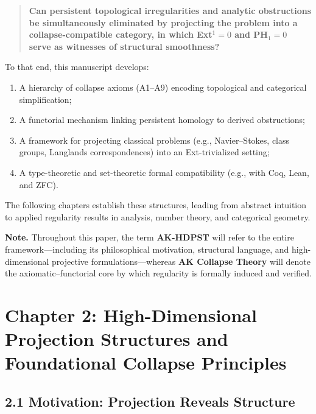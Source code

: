 \documentclass[11pt]{article}
\begin{document}
\begin{quote}
\textbf{Can persistent topological irregularities and analytic obstructions be simultaneously eliminated  
by projecting the problem into a collapse-compatible category,  
in which Ext$^1 = 0$ and PH$_1 = 0$ serve as witnesses of structural smoothness?}
\end{quote}

To that end, this manuscript develops:

\begin{enumerate}
  \item A hierarchy of collapse axioms (A1–A9) encoding topological and categorical simplification;
  \item A functorial mechanism linking persistent homology to derived obstructions;
  \item A framework for projecting classical problems (e.g., Navier–Stokes, class groups, Langlands correspondences)  
        into an Ext-trivialized setting;
  \item A type-theoretic and set-theoretic formal compatibility (e.g., with Coq, Lean, and ZFC).
\end{enumerate}

The following chapters establish these structures,  
leading from abstract intuition to applied regularity results  
in analysis, number theory, and categorical geometry.

\vspace{1em}
\noindent\textbf{Note.}  
Throughout this paper, the term \textbf{AK-HDPST} will refer to the entire framework—including its philosophical motivation, structural language,  
and high-dimensional projective formulations—whereas \textbf{AK Collapse Theory} will denote the axiomatic–functorial core  
by which regularity is formally induced and verified.



\section{Chapter 2: High-Dimensional Projection Structures and Foundational Collapse Principles}

\subsection*{2.1 Motivation: Projection Reveals Structure}
\end{document}
